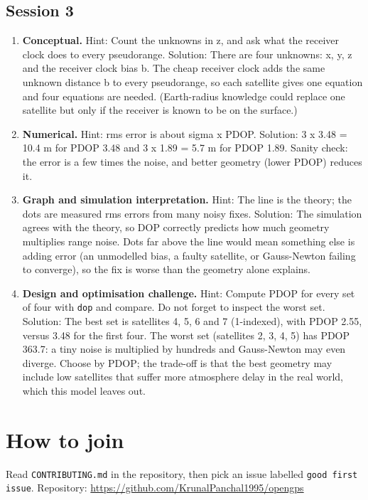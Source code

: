 \documentclass[11pt,a4paper]{article}
\begin{document}
\subsection*{Session 3}
\begin{enumerate}[nosep]
\item \textbf{Conceptual.} Hint: Count the unknowns in z, and ask what the receiver clock does to every pseudorange. Solution: There are four unknowns: x, y, z and the receiver clock bias b. The cheap receiver clock adds the same unknown distance b to every pseudorange, so each satellite gives one equation and four equations are needed. (Earth-radius knowledge could replace one satellite but only if the receiver is known to be on the surface.)
\item \textbf{Numerical.} Hint: rms error is about sigma x PDOP. Solution: 3 x 3.48 = 10.4 m for PDOP 3.48 and 3 x 1.89 = 5.7 m for PDOP 1.89. Sanity check: the error is a few times the noise, and better geometry (lower PDOP) reduces it.
\item \textbf{Graph and simulation interpretation.} Hint: The line is the theory; the dots are measured rms errors from many noisy fixes. Solution: The simulation agrees with the theory, so DOP correctly predicts how much geometry multiplies range noise. Dots far above the line would mean something else is adding error (an unmodelled bias, a faulty satellite, or Gauss-Newton failing to converge), so the fix is worse than the geometry alone explains.
\item \textbf{Design and optimisation challenge.} Hint: Compute PDOP for every set of four with \texttt{dop} and compare. Do not forget to inspect the worst set. Solution: The best set is satellites 4, 5, 6 and 7 (1-indexed), with PDOP 2.55, versus 3.48 for the first four. The worst set (satellites 2, 3, 4, 5) has PDOP 363.7: a tiny noise is multiplied by hundreds and Gauss-Newton may even diverge. Choose by PDOP; the trade-off is that the best geometry may include low satellites that suffer more atmosphere delay in the real world, which this model leaves out.
\end{enumerate}

\section{How to join}
Read \texttt{CONTRIBUTING.md} in the repository, then pick an issue labelled \texttt{good first issue}. Repository: \url{https://github.com/KrunalPanchal1995/opengps}
\end{document}
